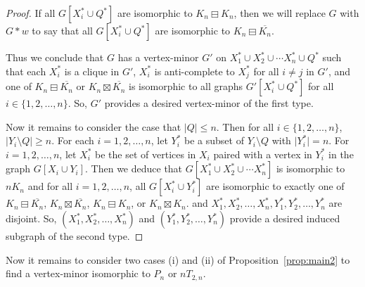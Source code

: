 \documentclass[11pt]{article}
\newcommand\abs[1]{\lvert #1\rvert}
\newcommand\mat{\boxminus}
\newcommand\antimat{\boxtimes}
\def\S_#1{\overline{K_{#1}}}
\begin{document}
\begin{proof}
        If all $G[X_i^*\cup Q^*]$ are isomorphic to $K_n\mat K_n$,
        then we will replace $G$ with $G*w$
        to say that all $G[X_i^*\cup Q^*]$ are isomorphic to $K_n\mat \S_n$.

        

        Thus we conclude that 
        $G$ has a vertex-minor $G'$ on $X_1^*\cup X_2^*\cup \cdots X_n^*\cup Q^*$
        such that
        each $X_i^*$ is a clique in $G'$,
        $X_i^*$ is anti-complete to $X_j^*$  for all $i\neq j$ in $G'$,
        and
        one of $K_n\mat \S_n$ or $K_n\antimat\S_n$
        is isomorphic to
        all graphs $G'[X_i^*\cup Q^*]$
        for all $i\in\{1,2,\ldots,n\}$.
        So, $G'$ provides a desired vertex-minor
        of the first type.

        Now it remains to consider the case that $\abs{Q}\le n$. Then
        for all $i\in\{1,2,\ldots,n\}$,
        $\abs{Y_i\setminus Q}\ge n$.
        For each $i=1,2,\ldots,n$,
        let $Y_i^*$ be a subset of $Y_i\setminus Q$ with $\abs{Y_i^*}=n$.
        For $i=1,2,\ldots,n$, let $X_i^*$ be the set of vertices in $X_i$
        paired with a vertex in $Y_i^*$ in the graph $G[X_i\cup Y_i]$.
        Then we deduce that
        $G[X_1^*\cup X_2^*\cup \cdots X_n^*]$ is isomorphic to $nK_n$
        and
        for all $i=1,2,\ldots,n$,
        all $G[X_i^*\cup Y_i^*]$ are isomorphic to
        exactly one of
        $K_n\mat \S_n$, $K_n\antimat\S_n$, $K_n\mat K_n$, or $K_n\antimat K_n$.
        and $X_1^*,X_2^*,\ldots,X_n^*,Y_1^*,Y_2^*,\ldots,Y_n^*$ are disjoint.
        So, $(X_1^*,X_2^*,\ldots,X_n^*)$ and $(Y_1^*,Y_2^*,\ldots,Y_n^*)$ provide a desired induced subgraph of the second type.
      \end{proof}
	
	

      Now it remains to consider two cases  (i) and (ii) of Proposition~\ref{prop:main2}
      to find a vertex-minor isomorphic to $P_n$ or $nT_{2,n}$.
	
\end{document}
